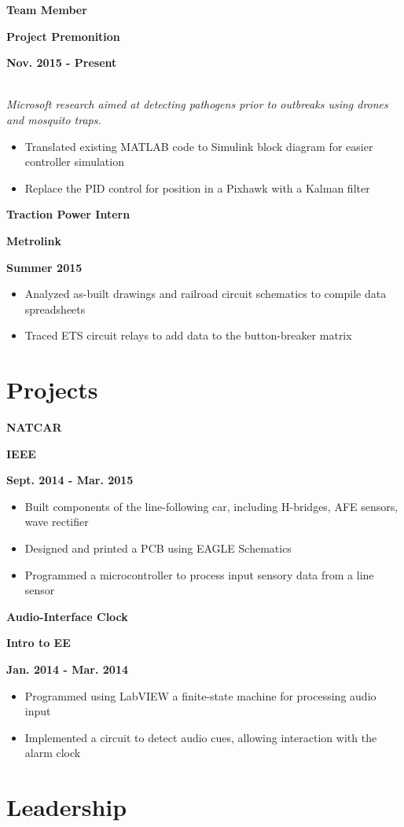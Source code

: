 \documentclass[12pt]{article}
\newcommand\textbox[1]{\parbox{.333\textwidth}{#1}}
\newcommand{\textlcr}[3]{\textbox{\textbf{#1}\hfill}\textbox{\hfil \textbf{#2}\hfil}\textbox{\hfill \textbf{#3}}}
\begin{document}
\bigskip
\textlcr{Team Member}{Project Premonition}{Nov. 2015 - Present} \\
\textit{Microsoft research aimed at detecting pathogens prior to outbreaks using drones and mosquito traps.}
\begin{itemize}
\item Translated existing MATLAB code to Simulink block diagram for easier controller simulation
\item Replace the PID control for position in a Pixhawk with a Kalman filter
\end{itemize}

\bigskip
\textlcr{Traction Power Intern}{Metrolink}{Summer 2015}
\begin{itemize}
\item Analyzed as-built drawings and railroad circuit schematics to compile data spreadsheets
\item Traced ETS circuit relays to add data to the button-breaker matrix
\end{itemize}

\section*{Projects}
\vspace*{-1em}\makebox[\linewidth]{\rule{\textwidth}{0.4pt}}

\textlcr{NATCAR}{IEEE}{Sept. 2014 - Mar. 2015}
\begin{itemize}
\item Built components of the line-following car, including H-bridges, AFE sensors, wave rectifier
\item Designed and printed a PCB using EAGLE Schematics
\item Programmed a microcontroller to process input sensory data from a line sensor
\end{itemize}

\bigskip
\textlcr{Audio-Interface Clock}{Intro to EE}{Jan. 2014 - Mar. 2014}
\begin{itemize}
\item Programmed using LabVIEW a finite-state machine for processing audio input
\item Implemented a circuit to detect audio cues, allowing interaction with the alarm clock
\end{itemize}

\section*{Leadership}
\vspace*{-1em}\makebox[\linewidth]{\rule{\textwidth}{0.4pt}}
\end{document}
